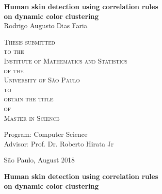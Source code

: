 \documentclass[11pt,twoside,a4paper]{book}
\theoremstyle{plain}
\theoremstyle{definition}
\begin{document}
\frontmatter 
\fancyhead[RO]{{\footnotesize\rightmark}\hspace{2em}\thepage}
\setcounter{tocdepth}{2}
\fancyhead[LE]{\thepage\hspace{2em}\footnotesize{\leftmark}}
\fancyhead[RE,LO]{}
\fancyhead[RO]{{\footnotesize\rightmark}\hspace{2em}\thepage}

\onehalfspacing  %

\thispagestyle{empty}
\begin{center}
    \vspace*{2.3cm}
    \textbf{\Large{Human skin detection using correlation rules\\ on dynamic color clustering}}\\
    
    \vspace*{1.2cm}
    \Large{Rodrigo Augusto Dias Faria}
    
    \vskip 2cm
    \textsc{
    Thesis submitted\\[-0.25cm] 
    to the\\[-0.25cm]
    Institute of Mathematics and Statistics\\[-0.25cm]
    of the\\[-0.25cm]
    University of São Paulo\\[-0.25cm]
    to\\[-0.25cm]
    obtain the title\\[-0.25cm]
    of\\[-0.25cm]
    Master in Science}
    
    \vskip 1.5cm
    Program: Computer Science\\
    Advisor: Prof. Dr. Roberto Hirata Jr

    
    \vskip 1.5cm %
    \normalsize{São Paulo, August 2018}
\end{center}

%
%
%
\newpage
\thispagestyle{empty}
    \begin{center}
        \vspace*{2.3 cm}
        \textbf{\Large{Human skin detection using correlation rules\\ on dynamic color clustering}}\\
        \vspace*{2 cm}
    \end{center}
\end{document}
